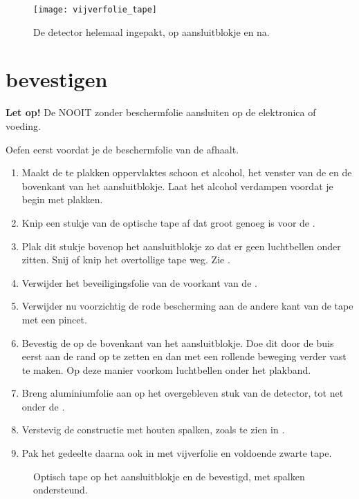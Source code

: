 \begin{figure}
    \centering
    \texttt{[image: vijverfolie\_tape]}
    \caption{De detector helemaal ingepakt, op aansluitblokje en \pmt na.}
    \label{fig:vijverfolie_tape}
\end{figure}


\section{\pmt bevestigen}

\textbf{Let op!} De \pmt NOOIT zonder beschermfolie aansluiten op de
elektronica of voeding.

Oefen eerst voordat je de beschermfolie van de \pmt afhaalt.

\begin{enumerate}
    \item Maakt de te plakken oppervlaktes schoon et alcohol, het
    venster van de \pmt en de bovenkant van het aansluitblokje. Laat het
    alcohol verdampen voordat je begin met plakken.
    \item Knip een stukje van de optische tape af dat groot genoeg is
    voor de \pmt.
    \item Plak dit stukje bovenop het aansluitblokje zo dat er geen
    luchtbellen onder zitten. Snij of knip het overtollige tape weg. Zie
    .
    \item Verwijder het beveiligingsfolie van de voorkant van de \pmt.
    \item Verwijder nu voorzichtig de rode bescherming aan de andere
    kant van de tape met een pincet.
    \item Bevestig de \pmt op de bovenkant van het aansluitblokje. Doe
    dit door de buis eerst aan de rand op te zetten en dan met een
    rollende beweging verder vast te maken. Op deze manier voorkom
    luchtbellen onder het plakband.
    \item Breng aluminiumfolie aan op het overgebleven stuk van de
    detector, tot net onder de \pmt.
    \item Verstevig de \pmt constructie met houten spalken, zoals te
    zien in .
    \item Pak het \pmt gedeelte daarna ook in met vijverfolie en
    voldoende zwarte tape.
\end{enumerate}

\begin{figure}
    \centering
    \caption{Optisch tape op het aansluitblokje en de \pmt bevestigd,
             met spalken ondersteund.}
\end{figure}


